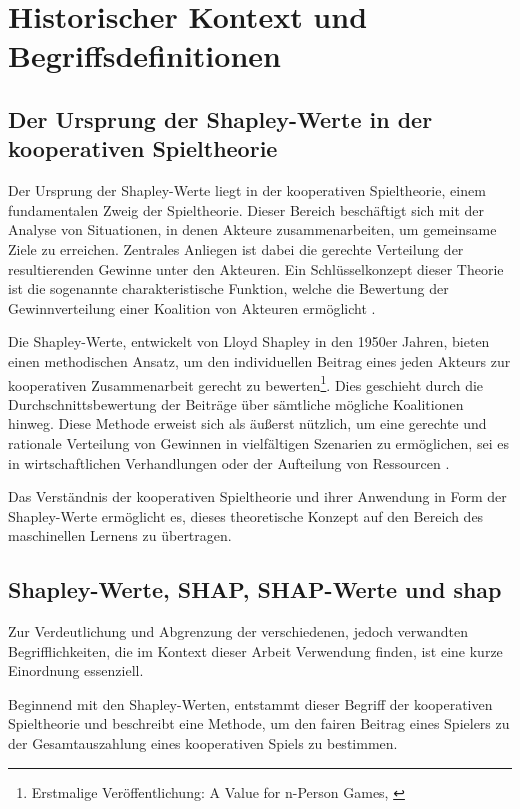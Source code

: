 \chapter{Historischer Kontext und Begriffsdefinitionen}



\section{Der Ursprung der Shapley-Werte in der kooperativen Spieltheorie}

Der Ursprung der Shapley-Werte liegt in der kooperativen Spieltheorie, einem fundamentalen Zweig der Spieltheorie. 
Dieser Bereich beschäftigt sich mit der Analyse von Situationen, in denen Akteure zusammenarbeiten, um gemeinsame Ziele zu erreichen. 
Zentrales Anliegen ist dabei die gerechte Verteilung der resultierenden Gewinne unter den Akteuren. Ein Schlüsselkonzept dieser Theorie 
ist die sogenannte charakteristische Funktion, welche die Bewertung der Gewinnverteilung einer Koalition von Akteuren ermöglicht \cite[S. 12]{Molnar_2023}.

Die Shapley-Werte, entwickelt von Lloyd Shapley in den 1950er Jahren, bieten einen methodischen Ansatz, um den individuellen Beitrag 
eines jeden Akteurs zur kooperativen Zusammenarbeit gerecht zu bewerten\footnote{Erstmalige Veröffentlichung: \glqq{}A Value for n-Person Games\grqq{}, \cite[S. 307-318]{Shapley+1953+307+318}}. Dies geschieht durch die Durchschnittsbewertung der Beiträge 
über sämtliche mögliche Koalitionen hinweg. Diese Methode erweist sich als äußerst nützlich, um eine gerechte und rationale Verteilung 
von Gewinnen in vielfältigen Szenarien zu ermöglichen, sei es in wirtschaftlichen Verhandlungen oder der Aufteilung von Ressourcen \cite[S. 215]{Molnar_2022}.

Das Verständnis der kooperativen Spieltheorie und ihrer Anwendung in Form der Shapley-Werte ermöglicht es, dieses theoretische Konzept 
auf den Bereich des maschinellen Lernens zu übertragen.

\section{Shapley-Werte, SHAP, SHAP-Werte und \textsf{shap}}

Zur Verdeutlichung und Abgrenzung der verschiedenen, jedoch verwandten Begrifflichkeiten, die im Kontext dieser Arbeit Verwendung finden, 
ist eine kurze Einordnung essenziell.

Beginnend mit den Shapley-Werten, entstammt dieser Begriff der kooperativen Spieltheorie und beschreibt eine Methode, 
um den fairen Beitrag eines Spielers zu der Gesamtauszahlung eines kooperativen Spiels zu bestimmen. 


